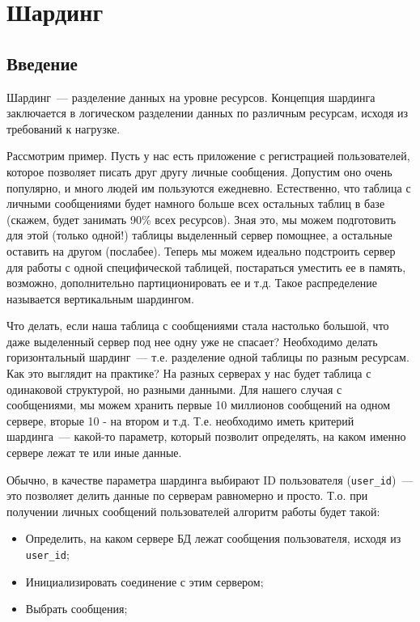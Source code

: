 \chapter{Шардинг}

\begin{epigraphs}
\end{epigraphs}

\section{Введение}

Шардинг~--- разделение данных на уровне ресурсов. Концепция шардинга заключается в логическом разделении данных по различным ресурсам, исходя из требований к нагрузке.

Рассмотрим пример. Пусть у нас есть приложение с регистрацией пользователей, которое позволяет писать друг другу личные сообщения. Допустим оно очень популярно, и много людей им пользуются ежедневно. Естественно, что таблица с личными сообщениями будет намного больше всех остальных таблиц в базе (скажем, будет занимать 90\% всех ресурсов). Зная это, мы можем подготовить для этой (только одной!) таблицы выделенный сервер помощнее, а остальные оставить на другом (послабее). Теперь мы можем идеально подстроить сервер для работы с одной специфической таблицей, постараться уместить ее в память, возможно, дополнительно партиционировать ее и т.д. Такое распределение называется вертикальным шардингом.

Что делать, если наша таблица с сообщениями стала настолько большой, что даже выделенный сервер под нее одну уже не спасает? Необходимо делать горизонтальный шардинг~--- т.е. разделение одной таблицы по разным ресурсам. Как это выглядит на практике? На разных серверах у нас будет таблица с одинаковой структурой, но разными данными. Для нашего случая с сообщениями, мы можем хранить первые 10 миллионов сообщений на одном сервере, вторые 10 - на втором и т.д. Т.е. необходимо иметь критерий шардинга~--- какой-то параметр, который позволит определять, на каком именно сервере лежат те или иные данные.

Обычно, в качестве параметра шардинга выбирают ID пользователя (\lstinline!user_id!)~--- это позволяет делить данные по серверам равномерно и просто. Т.о. при получении личных сообщений пользователей алгоритм работы будет такой:

\begin{itemize}
  \item Определить, на каком сервере БД лежат сообщения пользователя, исходя из \lstinline!user_id!;
  \item Инициализировать соединение с этим сервером;
  \item Выбрать сообщения;
\end{itemize}

